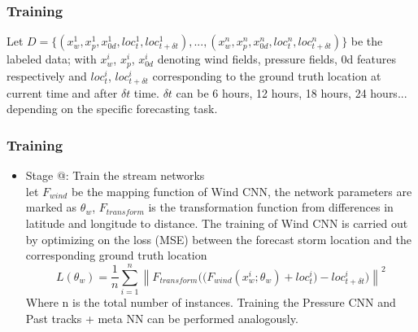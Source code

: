 \documentclass{beamer}
\makeatletter
\newcommand{\Rmnum}[1]{\expandafter\@slowromancap\romannumeral #1@}
\makeatother
\begin{document}
\begin{frame}
\frametitle{Training}
Let $D = \{(x_w^1, x_p^1, x_{0d}^1, loc_t^1, loc_{t+\delta t}^1), ..., (x_w^n, x_p^n, x_{0d}^n, loc_t^n, loc_{t+\delta t}^n)\}$ be the labeled data; with $x_w^i$, $x_p^i$, $x_{0d}^i$ denoting wind fields, pressure fields, 0d features respectively and $loc_t^i$, $loc_{t+\delta t}^i$ corresponding to the ground truth location at current time and after $\delta t$ time. $\delta t$ can be 6 hours, 12 hours, 18 hours, 24 hours... depending on the specific forecasting task. 
\end{frame}

\begin{frame}
\frametitle{Training}
	\begin{itemize}
		\item  Stage \Rmnum{1}: Train the stream networks \\ let $F_{wind}$ be the mapping function of Wind CNN, the network parameters are marked as $\theta_w$, $F_{transform}$ is the transformation function from differences in latitude and longitude to distance. The training of Wind CNN is carried out by optimizing on the loss (MSE) between the forecast storm location and the corresponding ground truth location 
		\begin{equation}
		\label{eq}
		L(\theta_w) = \frac{1}{n}\sum_{i=1}^{n} \left \| {F_{transform}((F_{wind}(x_w^i; \theta_w)} + loc^i_{t} ) - loc^i_{t+\delta t} ) \right \| ^2
		\end{equation}
		Where n is the total number of instances. Training the Pressure CNN and Past tracks + meta NN can be performed analogously.
	\end{itemize}
\end{frame}
\end{document}
